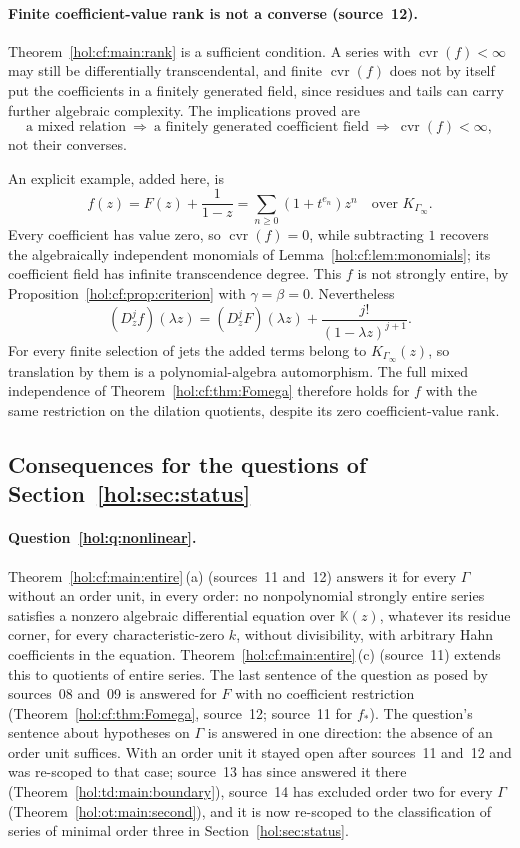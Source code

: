 \documentclass[11pt]{article}
\numberwithin{equation}{section}
\theoremstyle{definition}
\theoremstyle{remark}
\newcommand{\KK}{\mathbb K}
\newcommand{\cvr}{\operatorname{cvr}}
\begin{document}
\paragraph{Finite coefficient-value rank is not a converse (source~12).}
Theorem~\ref{hol:cf:main:rank} is a sufficient condition. A series with
$\cvr(f)<\infty$ may still be differentially transcendental, and finite
$\cvr(f)$ does not by itself put the coefficients in a finitely generated
field, since residues and tails can carry further algebraic complexity. The
implications proved are
\[
 \text{a mixed relation}\ \Longrightarrow\
 \text{a finitely generated coefficient field}\ \Longrightarrow\
 \cvr(f)<\infty,
\]
not their converses.

An explicit example, added here, is
\[
 f(z)=F(z)+\frac1{1-z}
 =\sum_{n\ge0}(1+t^{e_n})z^n
 \quad\text{over }K_{\Gamma_\infty}.
\]
Every coefficient has value zero, so $\cvr(f)=0$, while subtracting $1$
recovers the algebraically independent monomials of
Lemma~\ref{hol:cf:lem:monomials}; its coefficient field has infinite
transcendence degree. This $f$ is not strongly entire, by
Proposition~\ref{hol:cf:prop:criterion} with $\gamma=\beta=0$.
Nevertheless
\[
 (D_z^jf)(\lambda z)=(D_z^jF)(\lambda z)
       +\frac{j!}{(1-\lambda z)^{j+1}}.
\]
For every finite selection of jets the added terms belong to
$K_{\Gamma_\infty}(z)$, so translation by them is a polynomial-algebra
automorphism. The full mixed independence of
Theorem~\ref{hol:cf:thm:Fomega} therefore holds for $f$ with the same
restriction on the dilation quotients, despite its zero coefficient-value
rank.

\subsection{Consequences for the questions of Section~\ref{hol:sec:status}}
\label{hol:cf:sub:questions}

\paragraph{Question~\ref{hol:q:nonlinear}.}
Theorem~\ref{hol:cf:main:entire}\,(a) (sources~11 and~12) answers it for every
$\Gamma$ without an order unit, in every order: no nonpolynomial strongly
entire series satisfies a nonzero algebraic differential equation over
$\KK(z)$, whatever its residue corner, for every characteristic-zero $k$,
without divisibility, with arbitrary Hahn coefficients in the equation.
Theorem~\ref{hol:cf:main:entire}\,(c) (source~11) extends this to quotients of
entire series. The last sentence of the question as posed by sources~08
and~09 is answered for $F$ with no
coefficient restriction (Theorem~\ref{hol:cf:thm:Fomega}, source~12; source~11
for $f_*$). The question's sentence about hypotheses on $\Gamma$ is answered
in one direction: the absence of an order unit suffices. With an order unit
it stayed open after sources~11 and~12 and was re-scoped to that case;
source~13 has since answered it there (Theorem~\ref{hol:td:main:boundary}),
source~14 has excluded order two for every $\Gamma$
(Theorem~\ref{hol:ot:main:second}), and it is now re-scoped to the
classification of series of minimal order three in
Section~\ref{hol:sec:status}.
\end{document}
